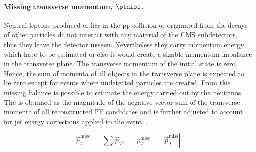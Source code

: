 \paragraph{Missing transverse momentum,
  $\boldsymbol{\ptmiss}$.}\label{sec:c2ptmiss}
Neutral leptons produced either in the pp collision or originated from
the decays of other particles do not interact with any material of the CMS
subdetectors, thus they leave the detector unseen. Nevertheless they
carry momentum energy which have to be estimated or else it would
create a sizable momentum imbalance in the transverse plane. The
transverse momentum of the initial state is zero. Hence, the sum of 
momenta of all objects in the transverse plane is
expected to be zero except for events where undetected particles are
created. From this missing balance is possible to estimate the energy
carried out by the neutrinos. \\
The \ptmiss is obtained as the magnitude of the negative vector sum of the transverse momenta of 
all reconstructed PF candidates and is further adjusted to account for
jet energy corrections applied to the event~\cite{CMS-PAS-JME-16-004}.
\begin{linenomath}
  \begin{equation}
    \label{eq:c2ptmiss}
    \overrightarrow{p}_T^{\text{miss}} \: = \: \sum \overrightarrow{p}_T,
    \;\;\; \;\;\; p_T^{\text{miss}} \: = \: |\overrightarrow{p}_T^{\text{miss}}|
  \end{equation}
\end{linenomath}

